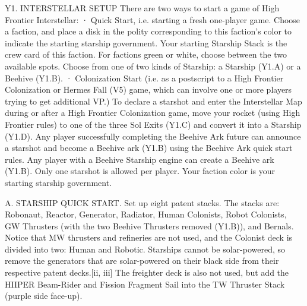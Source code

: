 \documentclass[a4paper]{book}
\begin{document}
Y1. INTERSTELLAR SETUP
There are two ways to start a game of High Frontier Interstellar:
·       Quick Start, i.e. starting a fresh one-player game. Choose a faction, and place a disk in the polity corresponding to this faction’s color to indicate the starting starship government. Your starting Starship Stack is the crew card of this faction. For factions green or white, choose between the two available spots. Choose from one of two kinds of Starship: a Starship (Y1.A) or a Beehive (Y1.B).
·       Colonization Start (i.e. as a postscript to a High Frontier Colonization or Hermes Fall (V5) game, which can involve one or more players trying to get additional VP.) To declare a starshot and enter the Interstellar Map during or after a High Frontier Colonization game, move your rocket (using High Frontier rules) to one of the three Sol Exits (Y1.C) and convert it into a Starship (Y1.D). Any player successfully completing the Beehive Ark future can announce a starshot and become a Beehive ark (Y1.B) using the Beehive Ark quick start rules. Any player with a Beehive Starship engine can create a Beehive ark (Y1.B). Only one starshot is allowed per player. Your faction color is your starting starship government.

A. STARSHIP QUICK START. Set up eight patent stacks. The stacks are: Robonaut, Reactor, Generator, Radiator, Human Colonists, Robot Colonists, GW Thrusters (with the two Beehive Thrusters removed (Y1.B)), and Bernals. Notice that MW thrusters and refineries are not used, and the Colonist deck is divided into two: Human and Robotic. Starships cannot be solar-powered, so remove the generators that are solar-powered on their black side from their respective patent decks.[ii, iii] The freighter deck is also not used, but add the HIIPER Beam-Rider and Fission Fragment Sail into the TW Thruster Stack (purple side face-up).
\end{document}
